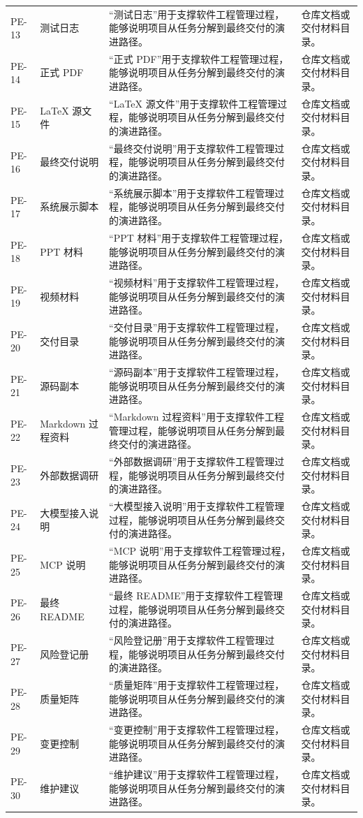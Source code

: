 \documentclass[12pt,a4paper]{ctexart}
\begin{document}
\begin{longtable}{L{1.7cm}L{4.0cm}L{6.2cm}L{3.6cm}}
PE-13 & 测试日志 & “测试日志”用于支撑软件工程管理过程，能够说明项目从任务分解到最终交付的演进路径。 & 仓库文档或交付材料目录。 \\
PE-14 & 正式 PDF & “正式 PDF”用于支撑软件工程管理过程，能够说明项目从任务分解到最终交付的演进路径。 & 仓库文档或交付材料目录。 \\
PE-15 & LaTeX 源文件 & “LaTeX 源文件”用于支撑软件工程管理过程，能够说明项目从任务分解到最终交付的演进路径。 & 仓库文档或交付材料目录。 \\
PE-16 & 最终交付说明 & “最终交付说明”用于支撑软件工程管理过程，能够说明项目从任务分解到最终交付的演进路径。 & 仓库文档或交付材料目录。 \\
PE-17 & 系统展示脚本 & “系统展示脚本”用于支撑软件工程管理过程，能够说明项目从任务分解到最终交付的演进路径。 & 仓库文档或交付材料目录。 \\
PE-18 & PPT 材料 & “PPT 材料”用于支撑软件工程管理过程，能够说明项目从任务分解到最终交付的演进路径。 & 仓库文档或交付材料目录。 \\
PE-19 & 视频材料 & “视频材料”用于支撑软件工程管理过程，能够说明项目从任务分解到最终交付的演进路径。 & 仓库文档或交付材料目录。 \\
PE-20 & 交付目录 & “交付目录”用于支撑软件工程管理过程，能够说明项目从任务分解到最终交付的演进路径。 & 仓库文档或交付材料目录。 \\
PE-21 & 源码副本 & “源码副本”用于支撑软件工程管理过程，能够说明项目从任务分解到最终交付的演进路径。 & 仓库文档或交付材料目录。 \\
PE-22 & Markdown 过程资料 & “Markdown 过程资料”用于支撑软件工程管理过程，能够说明项目从任务分解到最终交付的演进路径。 & 仓库文档或交付材料目录。 \\
PE-23 & 外部数据调研 & “外部数据调研”用于支撑软件工程管理过程，能够说明项目从任务分解到最终交付的演进路径。 & 仓库文档或交付材料目录。 \\
PE-24 & 大模型接入说明 & “大模型接入说明”用于支撑软件工程管理过程，能够说明项目从任务分解到最终交付的演进路径。 & 仓库文档或交付材料目录。 \\
PE-25 & MCP 说明 & “MCP 说明”用于支撑软件工程管理过程，能够说明项目从任务分解到最终交付的演进路径。 & 仓库文档或交付材料目录。 \\
PE-26 & 最终 README & “最终 README”用于支撑软件工程管理过程，能够说明项目从任务分解到最终交付的演进路径。 & 仓库文档或交付材料目录。 \\
PE-27 & 风险登记册 & “风险登记册”用于支撑软件工程管理过程，能够说明项目从任务分解到最终交付的演进路径。 & 仓库文档或交付材料目录。 \\
PE-28 & 质量矩阵 & “质量矩阵”用于支撑软件工程管理过程，能够说明项目从任务分解到最终交付的演进路径。 & 仓库文档或交付材料目录。 \\
PE-29 & 变更控制 & “变更控制”用于支撑软件工程管理过程，能够说明项目从任务分解到最终交付的演进路径。 & 仓库文档或交付材料目录。 \\
PE-30 & 维护建议 & “维护建议”用于支撑软件工程管理过程，能够说明项目从任务分解到最终交付的演进路径。 & 仓库文档或交付材料目录。 \\
\bottomrule
\end{longtable}
\end{document}
